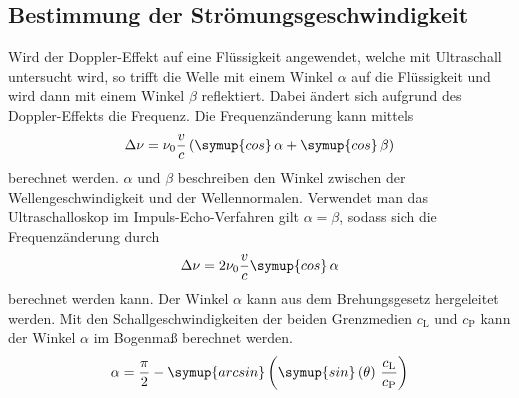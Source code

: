 \subsection{Bestimmung der Strömungsgeschwindigkeit}
\label{subsec:strömung}
Wird der Doppler-Effekt auf eine Flüssigkeit angewendet, welche mit Ultraschall untersucht wird, so trifft die Welle mit einem Winkel $\alpha$ auf die Flüssigkeit
und wird dann mit einem Winkel $\beta$ reflektiert. Dabei ändert sich aufgrund des Doppler-Effekts die Frequenz. Die Frequenzänderung kann mittels
\begin{equation*}
    \Delta\nu = \nu_0\frac{v}{c}\left(\symup{cos}\,\alpha + \symup{cos}\,\beta\right)
\end{equation*}
berechnet werden. $\alpha$ und $\beta$ beschreiben den Winkel zwischen der Wellengeschwindigkeit und der Wellennormalen. Verwendet man das Ultraschalloskop 
im Impuls-Echo-Verfahren gilt $\alpha = \beta$, sodass sich die Frequenzänderung durch 
\begin{equation}
    \Delta\nu = 2\nu_0\frac{v}{c}\symup{cos}\,\alpha
\end{equation}
berechnet werden kann. Der Winkel $\alpha$ kann aus dem Brehungsgesetz hergeleitet werden. Mit den Schallgeschwindigkeiten der beiden Grenzmedien $c_\text{L}$ und $c_\text{P}$
kann der Winkel $\alpha$ im Bogenmaß berechnet werden. 
\begin{equation}
    \label{eqn:alpha}
    \alpha = \frac{\pi}{2} - \symup{arcsin}\left(\symup{sin}\left(\theta\right)\,\frac{c_\text{L}}{c_\text{P}}\right)
\end{equation}
